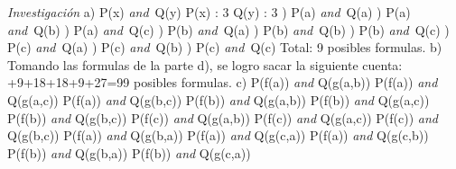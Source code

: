 \documentclass[12pt,a4paper,spanish]{article}
\begin{document}
\begin{enumerate}
\emph{Investigaci\'on}
\newline
\newline
a) P(x) \emph{and}\ Q(y)
\newline
P(x) : 3
\newline
Q(y) : 3
) P(a) \emph{and}\ Q(a)
) P(a) \emph{and}\ Q(b)
) P(a) \emph{and}\ Q(c)
) P(b) \emph{and}\ Q(a)
) P(b) \emph{and}\ Q(b)
) P(b) \emph{and}\ Q(c)
) P(c) \emph{and}\ Q(a)
) P(c) \emph{and}\ Q(b)
) P(c) \emph{and}\ Q(c)
\newline
\newline
Total: 9 posibles formulas.
\newline
\newline
b) Tomando las formulas de la parte d), se logro sacar la siguiente cuenta:
\newline
{}+9+18+18+9+27=99 posibles formulas.
\newline
\newline
c) P(f(a)) \emph{and} Q(g(a,b))
\newline
   P(f(a)) \emph{and} Q(g(a,c))
   \newline
   P(f(a)) \emph{and} Q(g(b,c))
   \newline
   P(f(b)) \emph{and} Q(g(a,b))
   \newline
   P(f(b)) \emph{and} Q(g(a,c))
   \newline
   P(f(b)) \emph{and} Q(g(b,c))
   \newline
   P(f(c)) \emph{and} Q(g(a,b))
   \newline
   P(f(c)) \emph{and} Q(g(a,c))
   \newline
   P(f(c)) \emph{and} Q(g(b,c))
   \newline
   P(f(a)) \emph{and} Q(g(b,a))
   \newline
   P(f(a)) \emph{and} Q(g(c,a))
   \newline
   P(f(a)) \emph{and} Q(g(c,b))
   \newline
   P(f(b)) \emph{and} Q(g(b,a))
   \newline
   P(f(b)) \emph{and} Q(g(c,a))
   \newline

\end{enumerate}
\end{document}
